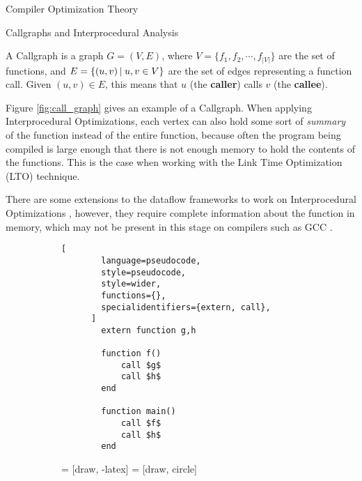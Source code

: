 \begin{section}{Compiler Optimization Theory}
\begin{subsection}{Callgraphs and Interprocedural Analysis}
\begin{definition}
	A Callgraph is a graph $G = (V, E)$, where $V = \{f_1, f_2, \cdots, f_{|V|}\}$
	are the set of functions, and $E = \{(u, v)\,|\;u, v \in V\}$ are the set
	of edges representing a function call. Given $(u, v) \in E$, this means
	that $u$ (the \textbf{caller}) calls $v$ (the \textbf{callee}).
\end{definition}

Figure \ref{fig:call_graph} gives an example of a Callgraph. When applying
Interprocedural Optimizations, each vertex can also hold some sort of
\textit{summary} of the function instead of the entire function, because often
the program being compiled is large enough that there is not enough memory
to hold the contents of the functions. This is the case when working with
the Link Time Optimization (LTO) technique.

There are some extensions to the dataflow frameworks to work on Interprocedural
Optimizations \citep{khedker2009data}, however, they require complete
information about the function in memory, which may not be present in this
stage on compilers such as GCC \citep{gcc_ipa}.

\begin{figure}[ht]
\centering
  \begin{subfigure}[b]{0.40\textwidth}
      \begin{lstlisting}[
        language=pseudocode,
        style=pseudocode,
        style=wider,
        functions={},
        specialidentifiers={extern, call},
      ]
        extern function g,h

        function f()
            call $g$
            call $h$
        end

        function main()
            call $f$
            call $h$
        end
      \end{lstlisting}
  \end{subfigure}
  \begin{subfigure}[b]{0.40\textwidth}
     = [draw, -latex]
     = [draw, circle]
    \begin{center}
\end{center}
\end{subfigure}
\end{figure}
\end{subsection}
\end{section}
